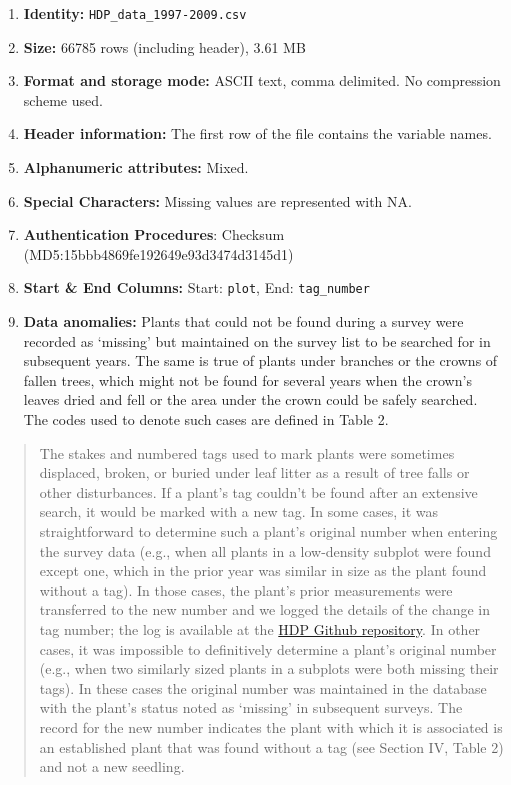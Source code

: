 \documentclass[
  12pt,
  man, donotrepeattitle]{apa6}
\begin{document}
\begin{enumerate}
\def\labelenumi{\arabic{enumi}.}
\item
  \textbf{Identity:} \texttt{HDP\_data\_1997-2009.csv}
\item
  \textbf{Size:} 66785 rows (including header), 3.61 MB
\item
  \textbf{Format and storage mode:} ASCII text, comma delimited. No compression scheme used.
\item
  \textbf{Header information:} The first row of the file contains the variable names.
\item
  \textbf{Alphanumeric attributes:} Mixed.
\item
  \textbf{Special Characters:} Missing values are represented with NA.
\item
  \textbf{Authentication Procedures}: Checksum (MD5:15bbb4869fe192649e93d3474d3145d1)
\item
  \textbf{Start \& End Columns:} Start: \texttt{plot}, End: \texttt{tag\_number}
\item
  \textbf{Data anomalies:} Plants that could not be found during a survey were recorded as `missing' but maintained on the survey list to be searched for in subsequent years. The same is true of plants under branches or the crowns of fallen trees, which might not be found for several years when the crown's leaves dried and fell or the area under the crown could be safely searched. The codes used to denote such cases are defined in Table 2.
\end{enumerate}

\begin{quote}
The stakes and numbered tags used to mark plants were sometimes displaced, broken, or buried under leaf litter as a result of tree falls or other disturbances. If a plant's tag couldn't be found after an extensive search, it would be marked with a new tag. In some cases, it was straightforward to determine such a plant's original number when entering the survey data (e.g., when all plants in a low-density subplot were found except one, which in the prior year was similar in size as the plant found without a tag). In those cases, the plant's prior measurements were transferred to the new number and we logged the details of the change in tag number; the log is available at the \href{https://github.com/BrunaLab/HeliconiaDataPaper}{HDP Github repository}. In other cases, it was impossible to definitively determine a plant's original number (e.g., when two similarly sized plants in a subplots were both missing their tags). In these cases the original number was maintained in the database with the plant's status noted as `missing' in subsequent surveys. The record for the new number indicates the plant with which it is associated is an established plant that was found without a tag (see Section IV, Table 2) and not a new seedling.
\end{quote}
\end{document}
